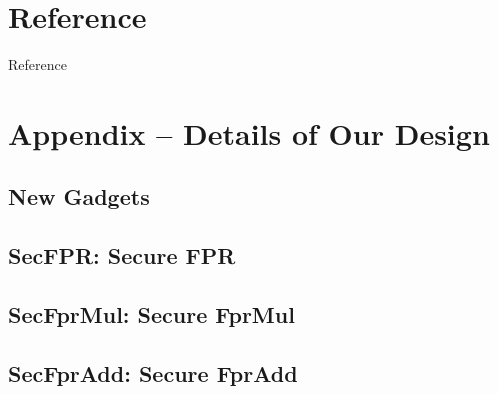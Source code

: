 


\section*{Reference}

\begin{frame}[allowframebreaks]{Reference}


\printbibliography[title=Reference]

\end{frame}

\appendix
\backupbegin

% 

\section{Appendix – Details of Our Design}
\label{sec:appendix}
\hypertarget{sec:appendix}{}

\subsection{New Gadgets}






\subsection{SecFPR: Secure FPR}


\subsection{SecFprMul: Secure FprMul}


\subsection{SecFprAdd: Secure FprAdd}


\backupend


